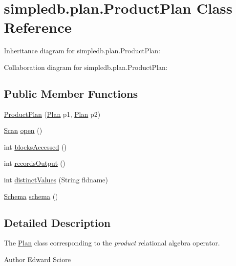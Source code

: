 \hypertarget{classsimpledb_1_1plan_1_1ProductPlan}{}\section{simpledb.\+plan.\+Product\+Plan Class Reference}
\label{classsimpledb_1_1plan_1_1ProductPlan}


Inheritance diagram for simpledb.\+plan.\+Product\+Plan\+:


Collaboration diagram for simpledb.\+plan.\+Product\+Plan\+:
\subsection*{Public Member Functions}
\begin{DoxyCompactItemize}
\item 
\hyperlink{classsimpledb_1_1plan_1_1ProductPlan_a1f6d8e3f0afa2edd6ea6a29997897041}{Product\+Plan} (\hyperlink{interfacesimpledb_1_1plan_1_1Plan}{Plan} p1, \hyperlink{interfacesimpledb_1_1plan_1_1Plan}{Plan} p2)
\item 
\hyperlink{interfacesimpledb_1_1query_1_1Scan}{Scan} \hyperlink{classsimpledb_1_1plan_1_1ProductPlan_a42d2c091a1b387611af9e960783c0931}{open} ()
\item 
int \hyperlink{classsimpledb_1_1plan_1_1ProductPlan_aed99978816a650c8f9268bb842d75a5b}{blocks\+Accessed} ()
\item 
int \hyperlink{classsimpledb_1_1plan_1_1ProductPlan_a5fce0180a7e282d587fc254dd302d009}{records\+Output} ()
\item 
int \hyperlink{classsimpledb_1_1plan_1_1ProductPlan_af15c3dd2da35b2d41ed02e0586603f39}{distinct\+Values} (String fldname)
\item 
\hyperlink{classsimpledb_1_1record_1_1Schema}{Schema} \hyperlink{classsimpledb_1_1plan_1_1ProductPlan_aefae6a42767a872bc50882b415a9f76c}{schema} ()
\end{DoxyCompactItemize}


\subsection{Detailed Description}
The \hyperlink{interfacesimpledb_1_1plan_1_1Plan}{Plan} class corresponding to the {\itshape product} relational algebra operator. \begin{DoxyAuthor}{Author}
Edward Sciore 
\end{DoxyAuthor}


